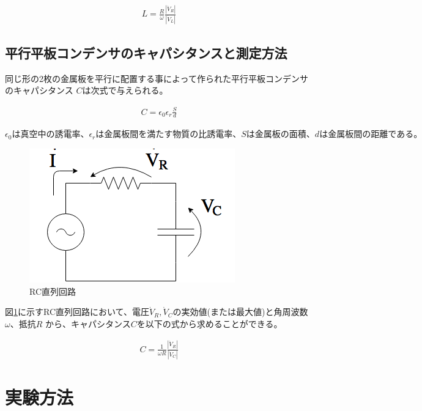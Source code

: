 \documentclass[dvipdfmx]{jsarticle}
\begin{document}
\begin{eqnarray}
  L = \frac{R}{\omega}\frac{|\dot V_R|}{|\dot V_L|}
\end{eqnarray}

\subsection{平行平板コンデンサのキャパシタンスと測定方法}
同じ形の2枚の金属板を平行に配置する事によって作られた平行平板コンデンサのキャパシタンス
$C$は次式で与えられる。

\begin{eqnarray}
  C = \epsilon_0 \epsilon_r \frac{S}{d}
\end{eqnarray}

$\epsilon_0は真空中の誘電率、\epsilon_rは金属板間を満たす物質の比誘電率、Sは金属板の
面積、dは金属板間の距離である。$

\begin{figure}[h]
  \centering
  \includegraphics[scale=0.4]{RC_Series_Circuit.png}
  \caption{RC直列回路}
  \label{fig:RC_Series_Circuit}
\end{figure}

図\ref{fig:RC_Series_Circuit}に示すRC直列回路において、電圧$\dot V_R, \dot V_C$の実効値(または最大値)と角周波数$\omega、抵抗R$
から、キャパシタンス$C$を以下の式から求めることができる。

\begin{eqnarray}
  C = \frac{1}{\omega R} \frac{|\dot V_R|}{|\dot V_C|}
\end{eqnarray}

\section{実験方法}
\end{document}

